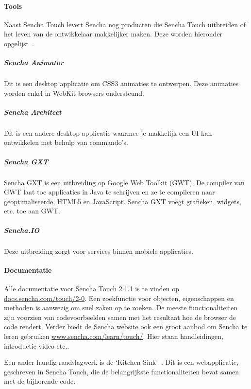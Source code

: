 \paragraph{Tools}
Naast Sencha Touch levert Sencha nog producten die Sencha Touch uitbreiden of het leven van de ontwikkelaar makkelijker maken.  
Deze worden hieronder opgelijst~\cite{Inc.}.  

\subparagraph{Sencha Animator}
Dit is een desktop applicatie om CSS3 animaties te ontwerpen.  
Deze animaties worden enkel in WebKit browsers ondersteund.

\subparagraph{Sencha Architect}
Dit is een andere desktop applicatie waarmee je makkelijk een UI kan ontwikkelen met behulp van  commando's.  

\subparagraph{Sencha GXT}
Sencha GXT is een uitbreiding op Google Web Toolkit (GWT).  
De compiler van GWT laat toe applicaties in Java te schrijven en ze te compileren naar geoptimaliseerde,   HTML5 en JavaScript.  Sencha GXT voegt grafieken,  widgets, etc. toe aan GWT.

\subparagraph{Sencha.IO}
Deze uitbreiding zorgt voor  services binnen mobiele applicaties.  

\paragraph{Documentatie}
Alle documentatie voor Sencha Touch 2.1.1 is te vinden op \url{docs.sencha.com/touch/2-0}.  
Een zoekfunctie voor objecten,  eigenschappen en methoden is aanwezig om snel zaken op te zoeken.  
De meeste functionaliteiten zijn voorzien van codevoorbeelden samen met het resultaat hoe de browser de code rendert.  
Verder biedt de Sencha website ook een groot aanbod om Sencha te leren gebruiken \url{www.sencha.com/learn/touch/}.  
Hier staan handleidingen,  introductie video etc..

Een ander handig raadslagwerk is de ‘Kitchen Sink'~\cite{Inc.2013}.  
Dit is een webapplicatie,  geschreven in Sencha Touch,  die de belangrijkste functionaliteiten bevat samen met de bijhorende code.  



